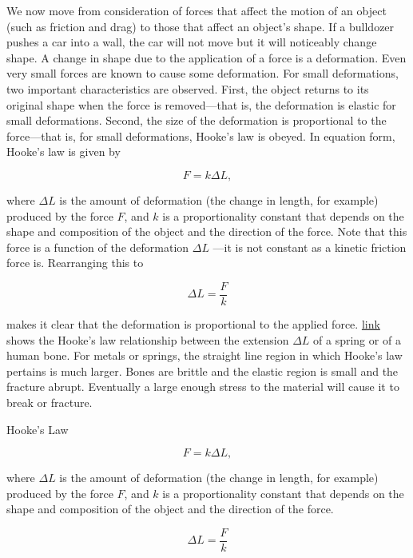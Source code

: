 \documentclass[
]{book}
\newenvironment{note}{}{}
\begin{document}
We now move from consideration of forces that affect the motion of an
object (such as friction and drag) to those that affect an object's
shape. If a bulldozer pushes a car into a wall, the car will not move
but it will noticeably change shape. A change in shape due to the
application of a force is a {deformation}. Even very
small forces are known to cause some deformation. For small
deformations, two important characteristics are observed. First, the
object returns to its original shape when the force is removed---that
is, the deformation is elastic for small deformations. Second, the size
of the deformation is proportional to the force---that is, for small
deformations, Hooke's law is obeyed. In equation form, {Hooke's
law} is given by

\leavevmode\hypertarget{eip-940}{}%
\[{{F = k\Delta L},}{}\]

where \({\Delta L}{}\) is the amount of deformation (the change in length,
for example) produced by the force
\(F{}\)\emph{}, and \(k{}\) is a proportionality
constant that depends on the shape and composition of the object and the
direction of the force. Note that this force is a function of the
deformation \({\Delta L}{}\) ---it is not constant as a kinetic friction
force is. Rearranging this to

\leavevmode\hypertarget{eip-72}{}%
\[{\Delta L = \frac{F}{k}}{}\]

makes it clear that the deformation is proportional to the applied
force. \protect\hyperlink{import-auto-id1165298678464}{link}
shows the Hooke's law relationship between the extension \({\Delta L}{}\)
of a spring or of a human bone. For metals or springs, the straight line
region in which Hooke's law pertains is much larger. Bones are brittle
and the elastic region is small and the fracture abrupt. Eventually a
large enough stress to the material will cause it to break or fracture.

\hypertarget{fs-id1165298979850}{}
\begin{note}

Hooke's Law

\leavevmode\hypertarget{eip-319}{}%
\[{F = {k\Delta L}},{}\]

where \({\Delta L}{}\) is the amount of deformation (the change in length,
for example) produced by the force
\(F{}\)\emph{}, and \(k{}\) is a proportionality
constant that depends on the shape and composition of the object and the
direction of the force.

\leavevmode\hypertarget{eip-516}{}%
\[{\Delta L = \frac{F}{k}}{}\]

\end{note}
\end{document}
